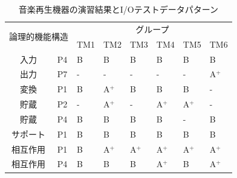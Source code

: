 \begin{table}[htbp]
  \centering
 \caption{音楽再生機器の演習結果とI/Oテストデータパターン}
    \begin{tabular}{|c|c|l|l|l|l|l|l|}
    \hline
    \multicolumn{2}{|c|}{\multirow{2}[4]{*}{論理的機能構造}} & \multicolumn{6}{c|}{グループ} \bigstrut\\
\cline{3-8}    \multicolumn{2}{|c|}{} & TM1   & TM2   & TM3   & TM4   & TM5   & TM6 \bigstrut\\
    \hline
    \hline
    入力    & P4    & B     & B     & B     & B     & B     & B \bigstrut\\
    \hline
    出力 & P7    & -     & -     & -     & -     & -     & A${}^\text{+}$  \bigstrut\\
    \hline
    変換 & P1    & B     & A${}^\text{+}$     & B     & B     & B     & - \bigstrut\\
    \hline
    貯蔵 & P2    & -     & A${}^\text{+}$     & -     & A${}^\text{+}$     & A${}^\text{+}$     & - \bigstrut\\
    \hline
    貯蔵 & P4    & B     & B     & B     & B     & -     & B \bigstrut\\
    \hline
    サポート & P1    & B     & B     & B     & B     & B     & B \bigstrut\\
    \hline
    相互作用 & P1    & B     & A${}^\text{+}$    & A${}^\text{+}$    & A${}^\text{+}$    & A${}^\text{+}$    & A${}^\text{+}$ \bigstrut\\
    \hline
    相互作用 & P4    & B     & B     & B     & A${}^\text{+}$     & B     & A${}^\text{+}$  \bigstrut\\
    \hline
    \end{tabular}%
 \label{tab:D-4-tab7}%
\end{table}%


